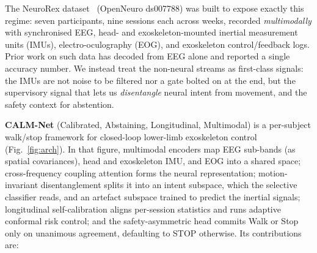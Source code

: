 \documentclass[conference]{IEEEtran}
\begin{document}
The NeuroRex dataset~\cite{sarkar2026} (OpenNeuro ds007788) was built to expose
exactly this regime: seven participants, nine sessions each across weeks, recorded
\emph{multimodally} with synchronised EEG, head- and exoskeleton-mounted inertial
measurement units (IMUs), electro-oculography (EOG), and exoskeleton control/feedback
logs. Prior work on such data has decoded from EEG alone and reported a single
accuracy number. We instead treat the non-neural streams as first-class signals: the
IMUs are not noise to be filtered nor a gate bolted on at the end, but the supervisory
signal that lets us \emph{disentangle} neural intent from movement, and the safety
context for abstention.

\textbf{CALM-Net} (Calibrated, Abstaining, Longitudinal, Multimodal) is a per-subject
walk/stop framework for closed-loop lower-limb exoskeleton control
(Fig.~\ref{fig:arch}). In that figure, multimodal encoders map EEG sub-bands (as
spatial covariances), head and exoskeleton IMU, and EOG into a shared space;
cross-frequency coupling attention forms the neural representation; motion-invariant
disentanglement splits it into an intent subspace, which the selective classifier
reads, and an artefact subspace trained to predict the inertial signals; longitudinal
self-calibration aligns per-session statistics and runs adaptive conformal risk
control; and the safety-asymmetric head commits Walk or Stop only on unanimous
agreement, defaulting to STOP otherwise. Its contributions are:
\end{document}
